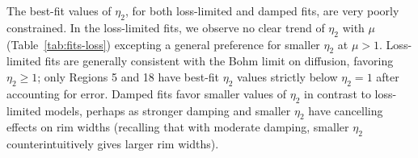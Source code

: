 \documentclass[iop, apj, numberedappendix]{emulateapj}
\newcommand*{\mt}{\mathrm}
\newcommand*{\unit}[1]{\;\mt{#1}}  %
\newcommand*{\Ecut}{E_{\mt{cut}}}
\newcommand*{\muG}{\unit{\mu G}}
\begin{document}



The best-fit values of $\eta_2$, for both loss-limited and damped fits,
are very poorly constrained.  In the loss-limited fits, we observe no clear
trend of $\eta_2$ with $\mu$ (Table~\ref{tab:fits-loss}) excepting a general
preference for smaller $\eta_2$ at $\mu > 1$.  Loss-limited fits are generally
consistent with the Bohm limit on diffusion, favoring $\eta_2 \geq 1$; only
Regions 5 and 18 have best-fit $\eta_2$ values strictly below $\eta_2 = 1$
after accounting for error.  Damped fits favor smaller values of $\eta_2$ in
contrast to loss-limited models, perhaps as stronger damping and smaller
$\eta_2$ have cancelling effects on rim widths (recalling that with moderate
damping, smaller $\eta_2$ counterintuitively gives larger rim widths).
\end{document}
